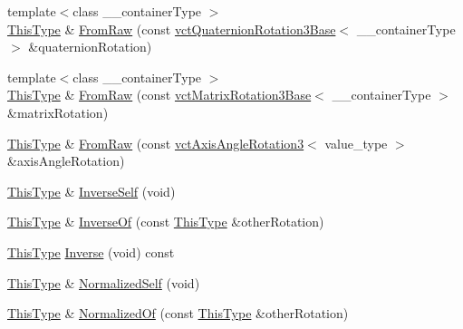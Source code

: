 \begin{DoxyCompactItemize}
\item 
{\footnotesize template$<$class \-\_\-\-\_\-container\-Type $>$ }\\\hyperlink{classvct_rodriguez_rotation3_base_add2bccab7f6e86c98b3f97fd00b06dcc}{This\-Type} \& \hyperlink{classvct_rodriguez_rotation3_base_abbc21c467e3e8ad692236b380cbdc0f3}{From\-Raw} (const \hyperlink{classvct_quaternion_rotation3_base}{vct\-Quaternion\-Rotation3\-Base}$<$ \-\_\-\-\_\-container\-Type $>$ \&quaternion\-Rotation)
\item 
{\footnotesize template$<$class \-\_\-\-\_\-container\-Type $>$ }\\\hyperlink{classvct_rodriguez_rotation3_base_add2bccab7f6e86c98b3f97fd00b06dcc}{This\-Type} \& \hyperlink{classvct_rodriguez_rotation3_base_a41b93f472a3bac59d5057f7a44476929}{From\-Raw} (const \hyperlink{classvct_matrix_rotation3_base}{vct\-Matrix\-Rotation3\-Base}$<$ \-\_\-\-\_\-container\-Type $>$ \&matrix\-Rotation)
\item 
\hyperlink{classvct_rodriguez_rotation3_base_add2bccab7f6e86c98b3f97fd00b06dcc}{This\-Type} \& \hyperlink{classvct_rodriguez_rotation3_base_ac21764b5558150331c617e998f5cc5dd}{From\-Raw} (const \hyperlink{classvct_axis_angle_rotation3}{vct\-Axis\-Angle\-Rotation3}$<$ value\-\_\-type $>$ \&axis\-Angle\-Rotation)
\item 
\hyperlink{classvct_rodriguez_rotation3_base_add2bccab7f6e86c98b3f97fd00b06dcc}{This\-Type} \& \hyperlink{classvct_rodriguez_rotation3_base_af08edcc08dee7bb319d0a4fa836fc1ff}{Inverse\-Self} (void)
\item 
\hyperlink{classvct_rodriguez_rotation3_base_add2bccab7f6e86c98b3f97fd00b06dcc}{This\-Type} \& \hyperlink{classvct_rodriguez_rotation3_base_a7e99a6439a25aecdf538af69a2277be3}{Inverse\-Of} (const \hyperlink{classvct_rodriguez_rotation3_base_add2bccab7f6e86c98b3f97fd00b06dcc}{This\-Type} \&other\-Rotation)
\item 
\hyperlink{classvct_rodriguez_rotation3_base_add2bccab7f6e86c98b3f97fd00b06dcc}{This\-Type} \hyperlink{classvct_rodriguez_rotation3_base_a6a599df940d9e3177b2905049465bbed}{Inverse} (void) const 
\item 
\hyperlink{classvct_rodriguez_rotation3_base_add2bccab7f6e86c98b3f97fd00b06dcc}{This\-Type} \& \hyperlink{classvct_rodriguez_rotation3_base_a73ea5f0cd884e6f4daf0aa9c5fe10fe6}{Normalized\-Self} (void)
\item 
\hyperlink{classvct_rodriguez_rotation3_base_add2bccab7f6e86c98b3f97fd00b06dcc}{This\-Type} \& \hyperlink{classvct_rodriguez_rotation3_base_aeb199a5055db34545f0351286a527671}{Normalized\-Of} (const \hyperlink{classvct_rodriguez_rotation3_base_add2bccab7f6e86c98b3f97fd00b06dcc}{This\-Type} \&other\-Rotation)

\end{DoxyCompactItemize}

